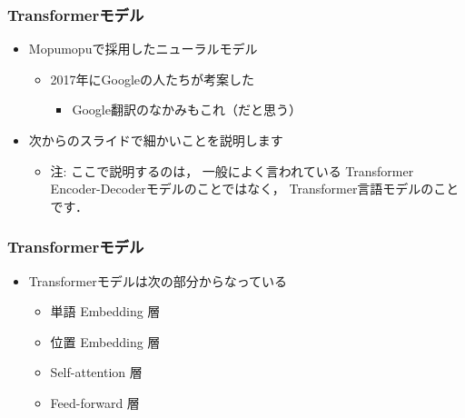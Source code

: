 \documentclass[14pt]{beamer}
\begin{document}
\begin{frame}
	\frametitle{Transformerモデル}

	\begin{itemize}
		\item Mopumopuで採用したニューラルモデル
			\begin{itemize}
				\item 2017年にGoogleの人たちが考案した
					\begin{itemize}
						\item Google翻訳のなかみもこれ（だと思う）
					\end{itemize}
			\end{itemize}
		\item 次からのスライドで細かいことを説明します
			\begin{itemize}
				\item {\scriptsize 注: ここで説明するのは，
					一般によく言われている
					Transformer Encoder-Decoderモデルのことではなく，
					Transformer言語モデルのことです．}
			\end{itemize}
	\end{itemize}
\end{frame}

\begin{frame}
	\frametitle{Transformerモデル}

	\begin{itemize}
		\item Transformerモデルは次の部分からなっている
			\begin{itemize}
				\item 単語 Embedding 層
				\item 位置 Embedding 層
				\item Self-attention 層
				\item Feed-forward 層
			\end{itemize}
	\end{itemize}

\end{frame}
\end{document}
